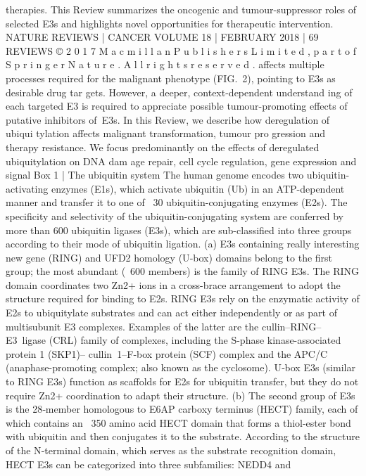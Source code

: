 therapies. This Review summarizes the oncogenic and tumour-suppressor roles of selected E3s and
highlights novel opportunities for therapeutic intervention.
NATURE REVIEWS | CANCER
 VOLUME 18 | FEBRUARY 2018 | 69
REVIEWS
©
 2
0
1
7
 M
a
c
m
i
l
l
a
n
 P
u
b
l
i
s
h
e
r
s
 L
i
m
i
t
e
d
,
 p
a
r
t
 o
f
 S
p
r
i
n
g
e
r
 N
a
t
u
r
e
.
 A
l
l
 r
i
g
h
t
s
 r
e
s
e
r
v
e
d
.
affects multiple processes required for the malignant
phenotype (FIG. 2), pointing to E3s as desirable drug tar­
gets. However, a deeper, context-dependent understand­
ing of each targeted E3 is required to appreciate possible
tumour-promoting effects of putative inhibitors of E3s.
In this Review, we describe how deregulation of ubiqui­
tylation affects malignant transformation, tumour pro­
gression and therapy resistance. We focus predominantly
on the effects of deregulated ubiquitylation on DNA dam­
age repair, cell cycle regulation, gene expression and signal
Box 1 | The ubiquitin system
The human genome encodes two ubiquitin-activating enzymes (E1s), which
activate ubiquitin (Ub) in an ATP-dependent manner and transfer it to one of
~30 ubiquitin-conjugating enzymes (E2s). The specificity and selectivity of the
ubiquitin-conjugating system are conferred by more than 600 ubiquitin ligases
(E3s), which are sub-classified into three groups according to their mode of
ubiquitin ligation. (a) E3s containing really interesting new gene (RING) and
UFD2 homology (U‑box) domains belong to the first group; the most abundant
(~600 members) is the family of RING E3s. The RING domain coordinates two
Zn2+ ions in a cross-brace arrangement to adopt the structure required for
binding to E2s. RING E3s rely on the enzymatic activity of E2s to ubiquitylate
substrates and can act either independently or as part of multisubunit E3
complexes. Examples of the latter are the cullin–RING–E3 ligase (CRL) family
of complexes, including the S-phase kinase-associated protein 1 (SKP1)–
cullin 1–F‑box protein (SCF) complex and the APC/C (anaphase-promoting
complex; also known as the cyclosome). U‑box E3s (similar to RING E3s)
function as scaffolds for E2s for ubiquitin transfer, but they do not require Zn2+
coordination to adapt their structure. (b) The second group of E3s is the
28‑member homologous to E6AP carboxy terminus (HECT) family, each of
which contains an ~350 amino acid HECT domain that forms a thiol-ester bond
with ubiquitin and then conjugates it to the substrate. According to the
structure of the N‑terminal domain, which serves as the substrate recognition
domain, HECT E3s can be categorized into three subfamilies: NEDD4 and
